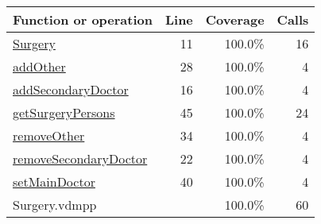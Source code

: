\bigskip
\begin{longtable}{|l|r|r|r|}
\hline
Function or operation & Line & Coverage & Calls \\
\hline
\hline
\hyperref[Surgery:11]{Surgery} & 11&100.0\% & 16 \\
\hline
\hyperref[addOther:28]{addOther} & 28&100.0\% & 4 \\
\hline
\hyperref[addSecondaryDoctor:16]{addSecondaryDoctor} & 16&100.0\% & 4 \\
\hline
\hyperref[getSurgeryPersons:45]{getSurgeryPersons} & 45&100.0\% & 24 \\
\hline
\hyperref[removeOther:34]{removeOther} & 34&100.0\% & 4 \\
\hline
\hyperref[removeSecondaryDoctor:22]{removeSecondaryDoctor} & 22&100.0\% & 4 \\
\hline
\hyperref[setMainDoctor:40]{setMainDoctor} & 40&100.0\% & 4 \\
\hline
\hline
Surgery.vdmpp & & 100.0\% & 60 \\
\hline
\end{longtable}

